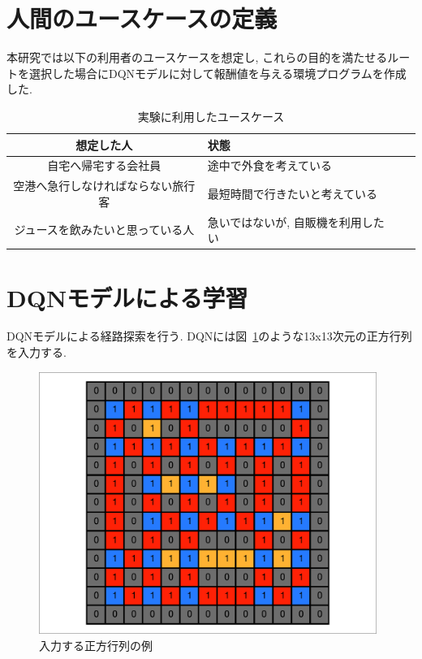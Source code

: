 \section{人間のユースケースの定義}

本研究では以下の利用者のユースケースを想定し, これらの目的を満たせるルートを選択した場合にDQNモデルに対して報酬値を与える環境プログラムを作成した.

\begin{table}[h]
    \caption{実験に利用したユースケース}
    \label{table:SpeedOfLight}
    \centering
    \begin{tabular}{clll}
      \hline
        想定した人 & 状態 \\
        \hline \hline
        自宅へ帰宅する会社員 & 途中で外食を考えている \\
        空港へ急行しなければならない旅行客 & 最短時間で行きたいと考えている \\
        ジュースを飲みたいと思っている人 & 急いではないが, 自販機を利用したい \\
      \hline
    \end{tabular}
  \end{table}
  



\section{DQNモデルによる学習}

DQNモデルによる経路探索を行う. DQNには図~\ref{ll_tensor}のような13x13次元の正方行列を入力する.


\begin{figure}[H]
    \centering  %
    \includegraphics[clip,width = 11.0cm]{assets/MAP_6.eps}
    \caption{入力する正方行列の例} \label{ll_tensor}
\end{figure}
  

%
%


